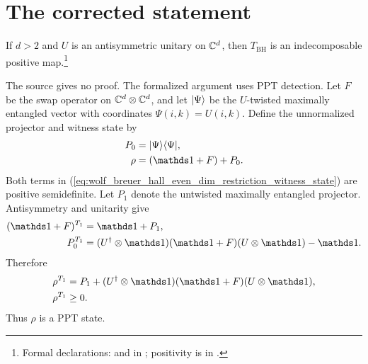 \documentclass{article}
\begin{document}
\section{The corrected statement}

If $d>2$ and $U$ is an antisymmetric unitary on $\mathbb{C}^d$, then
$T_{\mathrm{BH}}$ is an indecomposable positive map.\footnote{Formal
declarations:
 and
 in
; positivity is
 in
.}

The source gives no proof. The formalized argument uses PPT detection. Let
$F$ be the swap operator on $\mathbb{C}^d\otimes\mathbb{C}^d$, and let $|\Psi\rangle$ be the
$U$-twisted maximally entangled vector with coordinates
$\Psi(i,k)=U(i,k)$. Define the unnormalized projector and witness state by
\begin{align}
    P_0
        &=\ket{\Psi}\bra{\Psi},
    \label{eq:wolf_breuer_hall_even_dim_restriction_twisted_projector}\\
    \rho
        &=(\Id+F)+P_0.
    \label{eq:wolf_breuer_hall_even_dim_restriction_witness_state}
\end{align}
Both terms in
(\ref{eq:wolf_breuer_hall_even_dim_restriction_witness_state}) are positive
semidefinite. Let $P_1$ denote the untwisted maximally entangled projector.
Antisymmetry and unitarity give
\begin{align}
    (\Id+F)^{T_1}
        &=\Id+P_1,
    \label{eq:wolf_breuer_hall_even_dim_restriction_swap_partial_transpose}\\
    P_0^{T_1}
        &=(U^\dagger\otimes\Id)(\Id+F)(U\otimes\Id)-\Id.
    \label{eq:wolf_breuer_hall_even_dim_restriction_twisted_partial_transpose}
\end{align}
Therefore
\begin{align}
    \rho^{T_1}
        &=P_1+(U^\dagger\otimes\Id)(\Id+F)(U\otimes\Id),
    \label{eq:wolf_breuer_hall_even_dim_restriction_witness_partial_transpose}\\
    \rho^{T_1}
        &\geq0.
    \label{eq:wolf_breuer_hall_even_dim_restriction_witness_ppt}
\end{align}
Thus $\rho$ is a PPT state.
\end{document}
